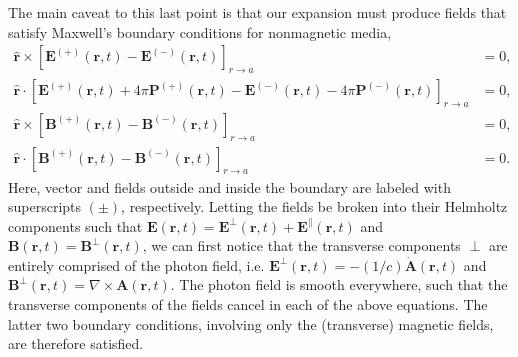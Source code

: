 \documentclass{article}
\begin{document}
The main caveat to this last point is that our expansion must produce fields that satisfy Maxwell's boundary conditions for nonmagnetic media,
\begin{equation}
\begin{split}
\hat{\mathbf{r}}\times\left[\mathbf{E}^{(+)}(\mathbf{r},t) - \mathbf{E}^{(-)}(\mathbf{r},t)\right]_{r\to a} &= 0,\\
\hat{\mathbf{r}}\cdot\left[\mathbf{E}^{(+)}(\mathbf{r},t) + 4\pi\mathbf{P}^{(+)}(\mathbf{r},t) - \mathbf{E}^{(-)}(\mathbf{r},t) - 4\pi\mathbf{P}^{(-)}(\mathbf{r},t)\right]_{r\to a} &= 0,\\
\hat{\mathbf{r}}\times\left[\mathbf{B}^{(+)}(\mathbf{r},t) - \mathbf{B}^{(-)}(\mathbf{r},t)\right]_{r\to a} &= 0,\\
\hat{\mathbf{r}}\cdot\left[\mathbf{B}^{(+)}(\mathbf{r},t) - \mathbf{B}^{(-)}(\mathbf{r},t)\right]_{r\to a} &= 0.
\end{split}
\end{equation}
Here, vector and fields outside and inside the boundary are labeled with superscripts $(\pm)$, respectively. Letting the fields be broken into their Helmholtz components such that $\mathbf{E}(\mathbf{r},t) = \mathbf{E}^\perp(\mathbf{r},t) + \mathbf{E}^\parallel(\mathbf{r},t)$ and $\mathbf{B}(\mathbf{r},t) = \mathbf{B}^\perp(\mathbf{r},t)$, we can first notice that the transverse components $\perp$ are entirely comprised of the photon field, i.e. $\mathbf{E}^\perp(\mathbf{r},t) = -(1/c)\dot{\mathbf{A}}(\mathbf{r},t)$ and $\mathbf{B}^\perp(\mathbf{r},t) = \nabla\times\mathbf{A}(\mathbf{r},t)$. The photon field is smooth everywhere, such that the transverse components of the fields cancel in each of the above equations. The latter two boundary conditions, involving only the (transverse) magnetic fields, are therefore satisfied.
\end{document}
